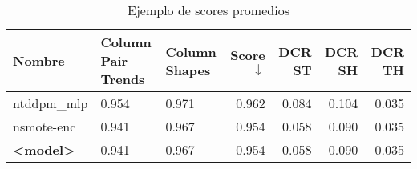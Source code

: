 \begin{table}[H]
    \centering
    \caption{Ejemplo de scores promedios}
    \label{tabla-show-score}
    \begin{tabular}{|m{10em}|m{5em}|m{5em}|r|r|r|r|}
        \hline
        \rowcolor[gray]{0.8}
        Nombre & Column Pair Trends & Column Shapes & \textbf{Score} $\downarrow$ & DCR ST& DCR SH& DCR TH\\ \hline
        ntddpm\_mlp & 0.954 & 0.971 & 0.962 & 0.084 & 0.104 & 0.035 \\ \hline
        nsmote-enc & 0.941 & 0.967 & 0.954 & 0.058 & 0.090 & 0.035 \\ \hline
        \textbf{<model>} & 0.941 & 0.967 & 0.954 & 0.058 & 0.090 & 0.035 \\ \hline
    \end{tabular}
\end{table}
